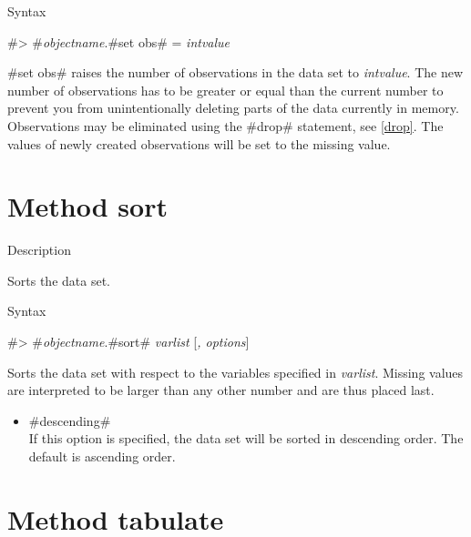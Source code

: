 \begin{stanza}{Syntax}

#> #{\em objectname}.#set obs# = {\em intvalue}

#set obs# raises the number of observations in the data set to
{\em intvalue}. The new number of observations has to be greater
or equal than the current number to prevent you from
unintentionally deleting parts of the data currently in memory.
Observations may be eliminated using the #drop# statement, see
\autoref{drop}. The values of newly created observations will be
set to the missing value.
\end{stanza}



\clearpage



\section{Method sort}
\label{sort}  


\begin{stanza}{Description}

Sorts the data set.
\end{stanza}


\begin{stanza}{Syntax}

#> #{\em objectname}.#sort# {\em varlist}  [{\em , options}]

Sorts the data set with respect to the variables specified in {\em
varlist}. Missing values are interpreted to be larger than any
other number and are thus placed last.
\end{stanza}



\begin{itemize}
\item #descending# \\
If this option is specified, the data set will be sorted in
descending order. The default is ascending order.
\end{itemize}



\clearpage



\section{Method tabulate}
\label{tabulate}  
 

